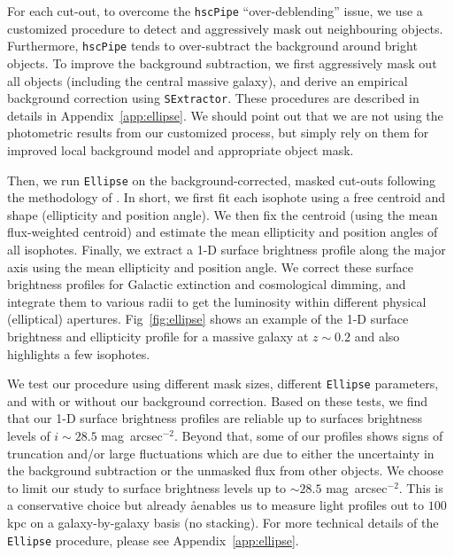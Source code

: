 \documentclass[a4paper,fleqn,usenatbib]{mnras}
\def\sb{mag~arcsec$^{-2}$}
\begin{document}
    For each cut-out, to overcome the \texttt{hscPipe} ``over-deblending'' issue, 
    we use a customized procedure to detect and aggressively mask out
    neighbouring objects. 
    Furthermore, \texttt{hscPipe} tends to over-subtract the background around 
    bright objects. 
    To improve the background subtraction, we first aggressively mask 
    out all objects (including the central massive galaxy), and derive an 
    empirical background correction using \texttt{SExtractor}.
    These procedures are described in details in Appendix~\ref{app:ellipse}. 
    We should point out that we are not using the photometric results from our 
    customized process, but simply rely on them for improved local background model
    and appropriate object mask.

    Then, we run \texttt{Ellipse} on the background-corrected, masked cut-outs 
    following the methodology of \citet{Li2012}. 
    In short, we first fit each isophote using a free centroid and shape 
    (ellipticity and position angle). 
    We then fix the centroid (using the mean flux-weighted centroid) and estimate
    the mean ellipticity and position angles of all isophotes. 
    Finally, we extract a 1-D surface brightness profile along the major axis using 
    the mean ellipticity and position angle. 
    We correct these surface brightness profiles for Galactic extinction and 
    cosmological dimming, and integrate them to various radii to get the luminosity 
    within different physical (elliptical) apertures. 
    Fig~\ref{fig:ellipse} shows an example of the 1-D surface brightness and 
    ellipticity profile for a massive galaxy at $z{\sim}0.2$ and also highlights 
    a few isophotes.    

    We test our procedure using different mask sizes, different \texttt{Ellipse} 
    parameters, and with or without our background correction. 
    Based on these tests, we find that our 1-D surface brightness profiles are reliable 
    up to surfaces brightness levels of $i{\sim}28.5$ \sb. 
    Beyond that, some of our profiles shows signs of truncation and/or large 
    fluctuations which are due to either the uncertainty in the background 
    subtraction or the unmasked flux from other objects.
    We choose to limit our study to surface brightness levels up to ${\sim} 28.5$ \sb. 
    This is a conservative choice but already åenables us to measure light profiles 
    out to $100$ kpc on a galaxy-by-galaxy basis (no stacking). 
    For more technical details of the \texttt{Ellipse} procedure, please see 
    Appendix~\ref{app:ellipse}.
\end{document}
